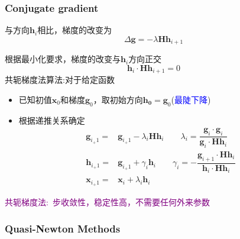 \documentclass[cjk,slidestop,compress,mathserif,blue]{beamer}
\begin{document}
\frame
{
	\frametitle{\textrm{Conjugate gradient}}
	与方向$\mathbf{h}_i$相比，梯度的改变为
	\begin{displaymath}
		\Delta\mathbf{g}=-\lambda\mathbf{H}\mathbf{h}_{i+1}
	\end{displaymath}

	根据最小化要求，梯度的改变与$\mathbf{h}_i$方向正交
	\begin{displaymath}
		\mathbf{h}_i\cdot\mathbf{H}\mathbf{h}_{i+1}=0
	\end{displaymath}
	共轭梯度法算法:对于给定函数
	\begin{itemize}
		\item 已知初值$\mathbf{x}_0$和梯度$\mathbf{g}_0$，取初始方向$\mathbf{h_0}=\mathbf{g}_0$(\textcolor{blue}{最陡下降})
		\item 根据递推关系确定
			\begin{displaymath}
				\begin{aligned}
					\mathbf{g}_{i_+1}=&\mathbf{g}_{i_+1}-\lambda_i\mathbf{H}\mathbf{h}_{i}\qquad \lambda_i=\dfrac{\mathbf{g}_i\cdot\mathbf{g}_i}{\mathbf{g}_i\cdot\mathbf{H}\mathbf{h}_i}\\	
					\mathbf{h}_{i_+1}=&\mathbf{g}_{i_+1}+\gamma_i\mathbf{h}_{i}\qquad \gamma_i=-\dfrac{\mathbf{g}_{i+1}\cdot\mathbf{H}\mathbf{h}_i}{\mathbf{h}_i\cdot\mathbf{H}\mathbf{h}_i}\\	
					\mathbf{x}_{i_+1}=&\mathbf{x}_{i}+\lambda_i\mathbf{h}_{i}
				\end{aligned}
			\end{displaymath}
	\end{itemize}
	\textcolor{purple}{共轭梯度法:~步收敛性，稳定性高，不需要任何外来参数}
}

\frame
{
	\frametitle{\textrm{Quasi-Newton Methods}}
	\fontsize{9.2pt}{3.9pt}
}
\end{document}
